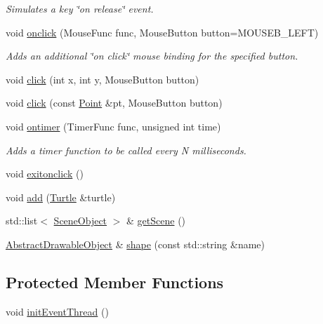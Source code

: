 \begin{DoxyCompactItemize}
\begin{DoxyCompactList}\small\item\em Simulates a key \char`\"{}on release\char`\"{} event. \end{DoxyCompactList}\item 
void \hyperlink{classcturtle_1_1InteractiveTurtleScreen_a05410a8f835e296f8ffca90ca3b0da24}{onclick} (Mouse\+Func func, Mouse\+Button button=M\+O\+U\+S\+E\+B\+\_\+\+L\+E\+FT)
\begin{DoxyCompactList}\small\item\em Adds an additional \char`\"{}on click\char`\"{} mouse binding for the specified button. \end{DoxyCompactList}\item 
void \hyperlink{classcturtle_1_1InteractiveTurtleScreen_a8fcbf045a17072cc8dda12f20035bb97}{click} (int x, int y, Mouse\+Button button)
\item 
void \hyperlink{classcturtle_1_1InteractiveTurtleScreen_a793b9bc88ac4ce7c5b6d8b6fbc96a3fe}{click} (const \hyperlink{structcturtle_1_1ivec2}{Point} \&pt, Mouse\+Button button)
\item 
void \hyperlink{classcturtle_1_1InteractiveTurtleScreen_ab60ddd682f7fa7df3635f936bcfd2f70}{ontimer} (Timer\+Func func, unsigned int time)
\begin{DoxyCompactList}\small\item\em Adds a timer function to be called every N milliseconds. \end{DoxyCompactList}\item 
void \hyperlink{classcturtle_1_1InteractiveTurtleScreen_ada27fc4b13ce99e45531ccf703d1fb8a}{exitonclick} ()
\item 
void \hyperlink{classcturtle_1_1InteractiveTurtleScreen_ab9696275e4a7b10225cfe10e48fd8c89}{add} (\hyperlink{classcturtle_1_1Turtle}{Turtle} \&turtle)
\item 
std\+::list$<$ \hyperlink{structcturtle_1_1SceneObject}{Scene\+Object} $>$ \& \hyperlink{classcturtle_1_1InteractiveTurtleScreen_aa1bd826458a718e7605424d5767f79c9}{get\+Scene} ()
\item 
\hyperlink{classcturtle_1_1AbstractDrawableObject}{Abstract\+Drawable\+Object} \& \hyperlink{classcturtle_1_1InteractiveTurtleScreen_ae855fb3d2acd831ce751e9387b8edc06}{shape} (const std\+::string \&name)
\end{DoxyCompactItemize}
\subsection*{Protected Member Functions}
\begin{DoxyCompactItemize}
\item 
void \hyperlink{classcturtle_1_1InteractiveTurtleScreen_aa7c436f89d052e42500356ee5f479776}{init\+Event\+Thread} ()
\end{DoxyCompactItemize}
